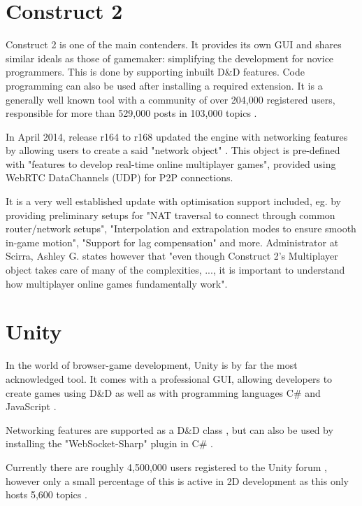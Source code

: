 \documentclass[bsc,frontabs,twoside,singlespacing,parskip,deptreport]{infthesis}     %
\begin{document}
\section{Construct 2}
Construct 2 is one of the main contenders. It provides its own GUI and shares similar ideals as those of gamemaker: simplifying the development for novice programmers. This is done by supporting inbuilt D\&D features. Code programming can also be used after installing a required extension. It is a generally well known tool with a community of over 204,000 registered users, responsible for more than 529,000 posts in 103,000 topics \cite{scirra_forum}.

In April 2014, release r164 to r168 updated the engine with networking features by allowing users to create a said "network object" \cite{construct2_multiplayer}. This object is pre-defined with "features to develop real-time online multiplayer games", provided using WebRTC DataChannels (UDP) for P2P connections. 

It is a very well established update with optimisation support included, eg. by providing preliminary setups for "NAT traversal to connect through common router/network setups", "Interpolation and extrapolation modes to ensure smooth in-game motion", "Support for lag compensation" and more. Administrator at Scirra, Ashley G. states however that "even though Construct 2's Multiplayer object takes care of many of the complexities, ..., it is important to understand how multiplayer online games fundamentally work"\cite{Construct2_Multiplayer_Tutorial}.


\section{Unity}
In the world of browser-game development, Unity is by far the most acknowledged tool. It comes with a professional GUI, allowing developers to create games using D\&D as well as with programming languages C\# and JavaScript \cite{unity_support}.

Networking features are supported as a D\&D class \cite{unity_networking}, but can also be used by installing the "WebSocket-Sharp" plugin in C\# \cite{unity_websocket_sharp}.

Currently there are roughly 4,500,000 users registered \cite{unity_stats} to the Unity forum \cite{unity_forum}, however only a small percentage of this is active in 2D development as this only hosts 5,600 topics \cite{unity_forum_2d}. 
\end{document}
